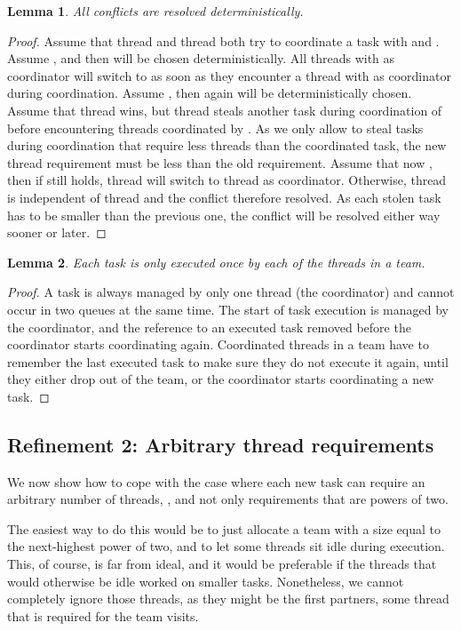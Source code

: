 \documentclass[preprint]{sigplanconf}
\newtheorem{lem}{Lemma}
\begin{document}
\begin{lem}
All conflicts are resolved deterministically.
\end{lem}

\begin{proof}
Assume that thread  and thread  both try to coordinate a task
with  and . Assume , and  then  will
be chosen deterministically. All threads with  as coordinator will
switch to  as soon as they encounter a thread with  as
coordinator during coordination. Assume , then again 
will be deterministically chosen. Assume that thread  wins, but
thread  steals another task during coordination of  before
encountering threads coordinated by . As we only allow to steal
tasks during coordination that require less threads than the
coordinated task, the new thread requirement  must be less than
the old requirement. Assume that now , then if  still holds, thread  will switch to thread
 as coordinator. Otherwise, thread  is independent of thread 
and the conflict therefore resolved. As each stolen task has to be
smaller than the previous one, the conflict will be resolved either
way sooner or later.
\end{proof}

\begin{lem}
Each task is only executed once by each of the threads in a team.
\end{lem}

\begin{proof}
A task is always managed by only one thread (the coordinator) and
cannot occur in two queues at the same time. The start of task
execution is managed by the coordinator, and the reference to an
executed task removed before the coordinator starts coordinating
again. Coordinated threads in a team have to remember the last
executed task to make sure they do not execute it again, until they
either drop out of the team, or the coordinator starts coordinating a
new task.
\end{proof}

\subsection{Refinement 2: Arbitrary thread requirements}

We now show how to cope with the case where each new task can require
an arbitrary number of threads, , and not only requirements
that are powers of two.

The easiest way to do this would be to just allocate a team with a
size equal to the next-highest power of two, and to let some threads
sit idle during execution. This, of course, is far from ideal, and it
would be preferable if the threads that would otherwise be idle worked
on smaller tasks. Nonetheless, we cannot completely ignore those
threads, as they might be the first partners, some thread that is
required for the team visits.
\end{document}
